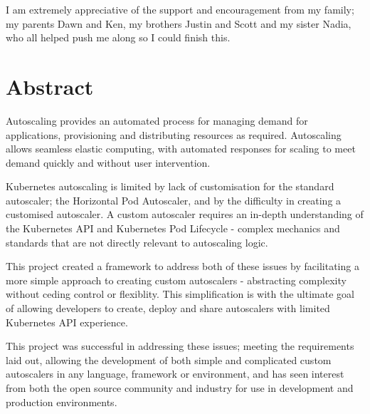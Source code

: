 I am extremely appreciative of the support and encouragement from my family; my
parents Dawn and Ken, my brothers Justin and Scott and my sister Nadia, who all
helped push me along so I could finish this. 

\newpage

\section*{Abstract}

Autoscaling provides an automated process for managing demand for applications,
provisioning and distributing resources as required. Autoscaling allows seamless
elastic computing, with automated responses for scaling to meet demand quickly
and without user intervention.

Kubernetes autoscaling is limited by lack of customisation for the standard
autoscaler; the Horizontal Pod Autoscaler, and by the difficulty in creating a
customised autoscaler. A custom autoscaler requires an in-depth understanding of
the Kubernetes API and Kubernetes Pod Lifecycle - complex mechanics and
standards that are not directly relevant to autoscaling logic.

This project created a framework to address both of these issues by facilitating
a more simple approach to creating custom autoscalers - abstracting complexity
without ceding control or flexiblity. This simplification is with the ultimate
goal of allowing developers to create, deploy and share autoscalers with limited
Kubernetes API experience.

This project was successful in addressing these issues; meeting the requirements
laid out, allowing the development of both simple and complicated custom
autoscalers in any language, framework or environment, and has seen interest
from both the open source community and industry for use in development and
production environments.

\newpage
